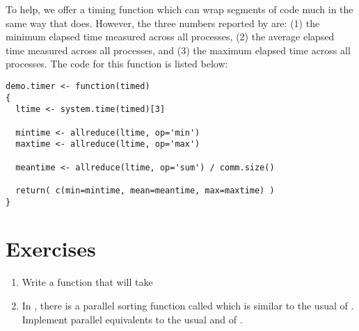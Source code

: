 To help, we offer a timing function  which can wrap segments of code much in the same way that  does.  However, the three numbers reported by  are: (1) the minimum elapsed time measured across all processes, (2) the average elapsed time measured across all processes, and (3) the maximum elapsed time across all processes.  The code for this function is listed below:

\begin{lstlisting}[language=rr,title=Timer Function]
demo.timer <- function(timed)
{
  ltime <- system.time(timed)[3]
  
  mintime <- allreduce(ltime, op='min')
  maxtime <- allreduce(ltime, op='max')
  
  meantime <- allreduce(ltime, op='sum') / comm.size()
  
  return( c(min=mintime, mean=meantime, max=maxtime) )
}
\end{lstlisting}



\section{Exercises}
\label{sec:mpi_for_the_r_user_exercise}

\begin{enumerate}[label=\thechapter-\arabic*]
\item Write a function that will take 
\item In , there is a parallel sorting function called
 which is similar to the usual  of .
Implement parallel equivalents to the usual  and 
of .

\end{enumerate}



